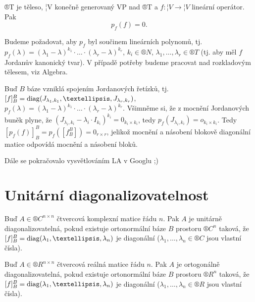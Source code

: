 \documentclass[12pt]{article}                   %
\begin{document}
    \begin{veta}
        ®T je těleso, ¦V konečně generovaný VP nad ®T a $f:¦V \rightarrow ¦V$ lineární operátor. Pak
        $$ p_f(f) = 0. $$

        \begin{dukazin}
            Budeme požadovat, aby $p_f$ byl součinem lineárních polynomů, tj. $p_f(\lambda) = (\lambda_1 - \lambda)^{k_1}·…·(\lambda_r - \lambda)^{k_r}$, $k_i \in ®N$, $\lambda_1, …, \lambda_r \in ®T$ (tj. aby měl $f$ Jordanův kanonický tvar). V případě potřeby budeme pracovat nad rozkladovým tělesem, viz Algebra.

            Buď $B$ báze vzniklá spojením Jordanových řetízků, tj. $[f]_B^B = \diag(J_{\lambda_1, k_1}, …, J_{\lambda_r, k_r})$, $p_f(\lambda) = (\lambda_1 - \lambda)^{k_1}·…·(\lambda_r - \lambda)^{k_r}$. Všimněme si, že z mocnění Jordanových buněk plyne, že $(J_{\lambda_i, k_i} - \lambda_i·I_{k_i})^{k_i} = 0_{k_i \times k_i}$, tedy $p_f(J_{\lambda_i, k_i}) = o_{k_i \times k_i}$. Tedy $[p_f(f)]_B^B = p_f([f_B^B]) = 0_{r\times r}$, jelikož mocnění a násobení blokově diagonální matice odpovídá mocnění a násobení bloků.
        \end{dukazin}
    \end{veta}

    \begin{poznamka}
        Dále se pokračovalo vysvětlováním LA v Googlu ;)
    \end{poznamka}


\section{Unitární diagonalizovatelnost}
    \begin{definice}
        Buď $A \in ®C^{n \times n}$ čtvercová komplexní matice řádu $n$. Pak $A$ je unitárně diagonalizovatelná, pokud existuje ortonormální báze $B$ prostoru $®C^n$ taková, že $[f]_B^B = \diag(\lambda_1, …, \lambda_n)$ je diagonální ($\lambda_1, …, \lambda_n \in ®C$ jsou vlastní čísla).
    \end{definice}

    \begin{definice}
        Buď $A \in ®R^{n \times n}$ čtvercová reálná matice řádu $n$. Pak $A$ je ortogonálně diagonalizovatelná, pokud existuje ortonormální báze $B$ prostoru $®R^n$ taková, že $[f]_B^B = \diag(\lambda_1, …, \lambda_n)$ je diagonální ($\lambda_1, …, \lambda_n \in ®R$ jsou vlastní čísla).
    \end{definice}
\end{document}
